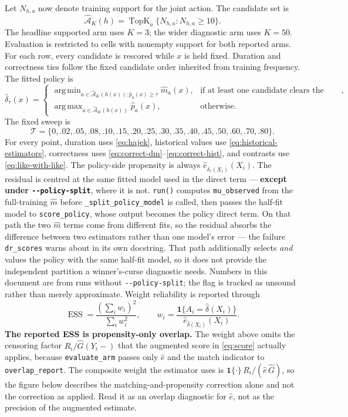 \documentclass[11pt,a4paper]{article}
\theoremstyle{plain}
\theoremstyle{definition}
\theoremstyle{remark}
\DeclareMathOperator*{\argmin}{arg\,min}
\DeclareMathOperator*{\argmax}{arg\,max}
\begin{document}
Let $N_{h,a}$ now denote training support for the joint action. The candidate set is
\begin{equation}
\widehat{\mathcal A}_K(h)=\operatorname{TopK}_{a}\{N_{h,a}:N_{h,a}\ge10\}.
\label{eq:asrun-candidates}
\end{equation}
The headline supported arm uses $K=3$; the wider diagnostic arm uses $K=50$. Evaluation is
restricted to cells with nonempty support for both reported arms. For each row, every candidate
is rescored while $x$ is held fixed. Duration and correctness ties follow the fixed candidate
order inherited from training frequency. The fitted policy is
\begin{equation}
\hat\delta_\tau(x)=
\begin{cases}
\argmin_{a\in\widehat{\mathcal A}_K(h(x)):\hat p_a(x)\ge\tau}\hat m_a(x),
&\text{if at least one candidate clears the floor},\\
\argmax_{a\in\widehat{\mathcal A}_K(h(x))}\hat p_a(x),&\text{otherwise}.
\end{cases}
\label{eq:asrun-policy}
\end{equation}
The fixed sweep is
\begin{equation}
\mathcal T=\{0,.02,.05,.08,.10,.15,.20,.25,.30,.35,.40,.45,.50,.60,.70,.80\}.
\label{eq:asrun-grid}
\end{equation}
For every point, duration uses \eqref{eq:hajek}, historical values use
\eqref{eq:historical-estimators}, correctness uses
\eqref{eq:correct-dm}--\eqref{eq:correct-hist}, and contrasts use
\eqref{eq:like-with-like}. The policy-side propensity is always
$\hat e_{\hat\delta_\tau(X_i)}(X_i)$. The residual is centred at the same fitted model used in
the direct term --- \textbf{except under \texttt{-{}-policy-split}}, where it is not.
\texttt{run()} computes \texttt{mu\_observed} from the full-training $\hat m$ before
\texttt{\_split\_policy\_model} is called, then passes the half-fit model to
\texttt{score\_policy}, whose output becomes the policy direct term. On that path the two $\hat
m$ terms come from different fits, so the residual absorbs the difference between two
estimators rather than one model's error --- the failure \texttt{dr\_scores} warns about in its
own docstring. That path additionally selects \emph{and} values the policy with the same
half-fit model, so it does not provide the independent partition a winner's-curse diagnostic
needs. Numbers in this document are from runs without \texttt{-{}-policy-split}; the flag is
tracked as unsound rather than merely approximate. Weight reliability is reported through
\[
\operatorname{ESS}=\frac{(\sum_iw_i)^2}{\sum_iw_i^2},
\qquad
w_i=\frac{\mathbf 1\{A_i=\hat\delta(X_i)\}}{\hat e_{\hat\delta(X_i)}(X_i)}.
\]
\textbf{The reported ESS is propensity-only overlap.} The weight above omits the censoring
factor $R_i/\hat G(Y_i-)$ that the augmented score in \eqref{eq:score} actually applies, because
\texttt{evaluate\_arm} passes only $\hat e$ and the match indicator to \texttt{overlap\_report}.
The composite weight the estimator uses is $\mathbf 1\{\cdot\}\,R_i/(\hat e\,\hat G)$, so the
figure below describes the matching-and-propensity correction alone and not the correction as
applied. Read it as an overlap diagnostic for $\hat e$, not as the precision of the augmented
estimate.
\end{document}
